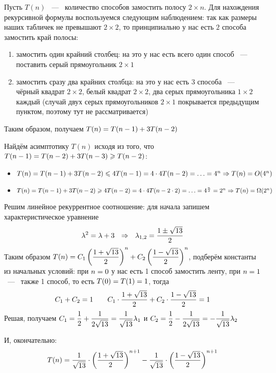 \documentclass[a4paper,12pt]{article}
\begin{document}
\begin{solution}
	
	Пусть $T(n)$ ~---~ количество способов замостить полосу $2\times n$. Для нахождения рекурсивной формулы воспользуемся следующим наблюдением: так как размеры наших табличек не превышают $2\times 2$, то принципиально у нас есть $2$ способа замостить край полосы: 
	
	\begin{enumerate}
		\item замостить один крайний столбец: на это у нас есть всего один способ ~---~ поставить серый прямоугольник $2\times 1$
		\item замостить сразу два крайних столбца: на это у нас есть $3$ способа ~---~ чёрный квадрат $2\times 2$, белый квадрат $2\times 2$, два серых прямоугольника $1\times 2$ каждый (случай двух серых прямоугольников $2\times 1$ покрывается предыдущим пунктом, поэтому тут не рассматривается)
	\end{enumerate}
	
	Таким образом, получаем $T(n) \hm{=} T(n-1) + 3T(n-2)$
	
	Найдём асимптотику $T(n)$ исходя из того, что $T(n-1) \hm{=} T(n-2) + 3T(n-3) \ge T(n-2)$:
	
	\begin{itemize}
		\item $T(n) \hm{=} T(n-1) + 3T(n-2) \le 4T(n-1) \hm{=} 4 \cdot 4T(n-2) \hm{=} \ldots \hm{=} 4^n \Ra T(n) \hm{=} O(4^n)$
		\item $T(n) \hm{=} T(n-1) + 3T(n-2) \ge 4T(n-2) \hm{=} 4 \cdot 4T(n-2 \cdot 2) \hm{=} \ldots \hm{=} 4^{\frac{n}{2}} \hm{=} 2^n \Ra T(n) \hm{=} \Omega(2^n)$
	\end{itemize}

	Решим линейное рекуррентное соотношение: для начала запишем характеристическое уравнение
	$$\lambda^2 \hm{=} \lambda + 3 \ \ \Ra \ \ \lambda_{1, 2} \hm{=} \dfrac{1 \pm \sqrt{13} }{2}$$
	Таким образом $T(n) \hm{=} C_1 \left( \dfrac{1 + \sqrt{13} }{2}\right) ^n + C_2 \left( \dfrac{1 - \sqrt{13} }{2}\right) ^n$, подберём константы из начальных условий: при $n \hm{=} 0$ у нас есть 1 способ замостить ленту, при $n\hm{=}1$ ~---~ также 1 способ, то есть $T(0) \hm{=} T(1) \hm{=} 1$, тогда
	$$C_1 + C_2 \hm{=} 1 \ \ \ \ \ \ C_1 \cdot \dfrac{1 + \sqrt{13} }{2} + C_2 \cdot \dfrac{1 - \sqrt{13} }{2} \hm{=} 1$$
	Решая, получаем $C_1 \hm{=} \dfrac{1}{2} + \dfrac{1}{2\sqrt{13}} \hm{=} \dfrac{1}{\sqrt{13}} \lambda_{1}$ и $C_2 \hm{=} \dfrac{1}{2} - \dfrac{1}{2\sqrt{13}} \hm{=} - \dfrac{1}{\sqrt{13}} \lambda_{2}$
	
	И, окончательно: $$T(n) \hm{=} \dfrac{1}{\sqrt{13}} \cdot \left( \dfrac{1 + \sqrt{13} }{2}\right) ^{n+1} - \dfrac{1}{\sqrt{13}} \cdot \left( \dfrac{1 - \sqrt{13} }{2}\right) ^{n+1}$$
	
\end{solution}
\end{document}
